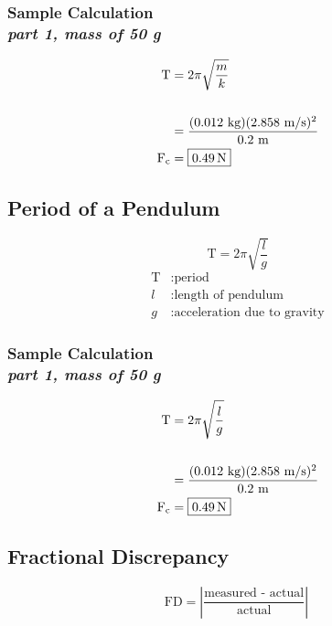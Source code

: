 \subsubsection{Sample Calculation \\ {\normalfont \small\textit{part 1, mass of 50 g}}}

{\centering
\begin{align*}
	\text{T} &= 2\pi \sqrt{\frac{m}{k}} \\ \\
			&= \frac{(0.012\text{ kg})(2.858\text{ m/s})^2}{0.2\text{ m}} \\
	\text{F\textsubscript{c}}  &= \boxed{0.49\,\text{N}}
\end{align*}}

\subsection{Period of a Pendulum} 

{\centering
\begin{equation}
	\text{T} = 2\pi \sqrt{\frac{l}{g}}
	\label{eq:pendulum}
\end{equation}
\begin{align*}
	\text{T} &: \text{period} \\
	l &: \text{length of pendulum} \\
	g &: \text{acceleration due to gravity}
\end{align*}}

\subsubsection{Sample Calculation \\ {\normalfont \small\textit{part 1, mass of 50 g}}}

{\centering
\begin{align*}
	\text{T} &= 2\pi \sqrt{\frac{l}{g}} \\ \\
			&= \frac{(0.012\text{ kg})(2.858\text{ m/s})^2}{0.2\text{ m}} \\
	\text{F\textsubscript{c}}  &= \boxed{0.49\,\text{N}}
\end{align*}}




\subsection{Fractional Discrepancy}
\vspace{0.5cm}
\begin{equation}
	\text{FD}	= \left| \frac{\text{measured - actual}}{\text{actual}} \right|\
	\label{eq:fdisc}
\end{equation}

